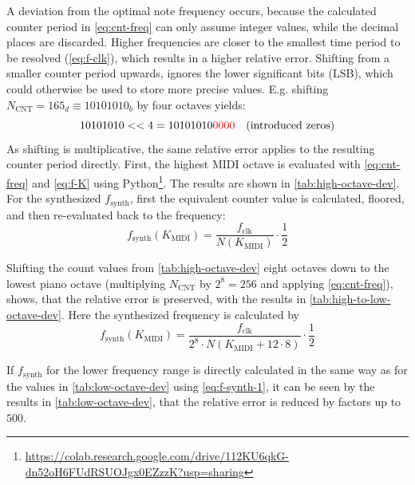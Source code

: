 A deviation from the optimal note frequency occurs, because the calculated counter period in \autoref{eq:cnt-freq} can only assume integer values, while the decimal places are discarded. Higher frequencies are closer to the smallest time period to be resolved (\autoref{eq:f-clk}), which results in a higher relative error. Shifting from a smaller counter period upwards, ignores the lower significant bits (LSB), which could otherwise be used to store more precise values. E.g. shifting $N_\text{CNT}=165_d\equiv 10101010_b$ by four octaves yields:
\[
	10101010 << 4 = 10101010{\color{red}0000}\quad (\text{introduced zeros})
\]
As shifting is multiplicative, the same relative error applies to the resulting counter period directly. First, the highest MIDI octave is evaluated with \autoref{eq:cnt-freq} and \autoref{eq:f-K} using Python\footnote{\url{https://colab.research.google.com/drive/112KU6qkG-dn52oH6FUdRSUOJgx0EZzzK?usp=sharing}}. The results are shown in \autoref{tab:high-octave-dev}. For the synthesized $f_\text{synth}$, first the equivalent counter value is calculated, floored, and then re-evaluated back to the frequency:
\begin{equation}
	f_\text{synth}(K_\text{MIDI}) = \frac{f_\text{clk}}{N(K_\text{MIDI})}\cdot \frac{1}{2}\label{eq:f-synth-1}
\end{equation}

Shifting the count values from \autoref{tab:high-octave-dev} eight octaves down to the lowest piano octave (multiplying $N_\text{CNT}$ by $2^8=256$ and applying \autoref{eq:cnt-freq}), shows, that the relative error is preserved, with the results in \autoref{tab:high-to-low-octave-dev}. Here the synthesized frequency is calculated by
\begin{equation}
	f_{\text{synth}}(K_\text{MIDI}) = \frac{f_\text{clk}}{2^8 \cdot N(K_\text{MIDI}+12\cdot 8)}\cdot \frac{1}{2}
\end{equation}

If $f_\text{synth}$ for the lower frequency range is directly calculated in the same way as for the values in \autoref{tab:low-octave-dev} using \autoref{eq:f-synth-1}, it can be seen by the results in \autoref{tab:low-octave-dev}, that the relative error is reduced by factors up to $500$.



\begin{table}[htbp]
	\caption{Half counter values of the highest octave (8) by direct calculation from the MIDI note number. The error is caused by the truncation of the counter period to an integer value.}\label{tab:high-octave-dev}
	
\end{table}

